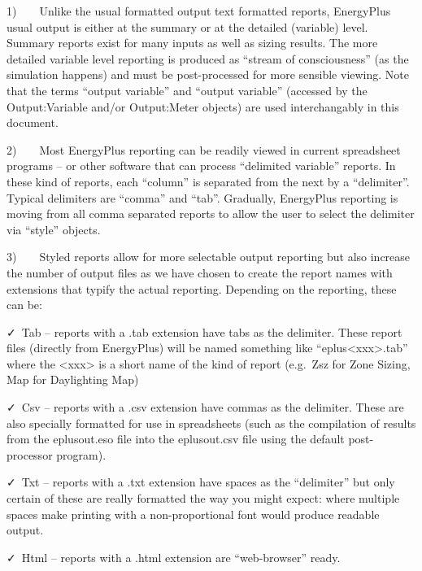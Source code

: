 1)~~~~Unlike the usual formatted output text formatted reports, EnergyPlus usual output is either at the summary or at the detailed (variable) level. Summary reports exist for many inputs as well as sizing results. The more detailed variable level reporting is produced as ``stream of consciousness'' (as the simulation happens) and must be post-processed for more sensible viewing. Note that the terms ``output variable'' and ``output variable'' (accessed by the Output:Variable and/or Output:Meter objects) are used interchangably in this document.

2)~~~~Most EnergyPlus reporting can be readily viewed in current spreadsheet programs -- or other software that can process ``delimited variable'' reports. In these kind of reports, each ``column'' is separated from the next by a ``delimiter''. Typical delimiters are ``comma'' and ``tab''. Gradually, EnergyPlus reporting is moving from all comma separated reports to allow the user to select the delimiter via ``style'' objects.

3)~~~~Styled reports allow for more selectable output reporting but also increase the number of output files as we have chosen to create the report names with extensions that typify the actual reporting. Depending on the reporting, these can be:

✓~Tab -- reports with a .tab extension have tabs as the delimiter. These report files (directly from EnergyPlus) will be named something like ``eplus\textless{}xxx\textgreater{}.tab'' where the \textless{}xxx\textgreater{} is a short name of the kind of report (e.g.~Zsz for Zone Sizing, Map for Daylighting Map)

✓~Csv -- reports with a .csv extension have commas as the delimiter. These are also specially formatted for use in spreadsheets (such as the compilation of results from the eplusout.eso file into the eplusout.csv file using the default post-processor program).

✓~Txt -- reports with a .txt extension have spaces as the ``delimiter'' but only certain of these are really formatted the way you might expect: where multiple spaces make printing with a non-proportional font would produce readable output.

✓~Html -- reports with a .html extension are ``web-browser'' ready.
